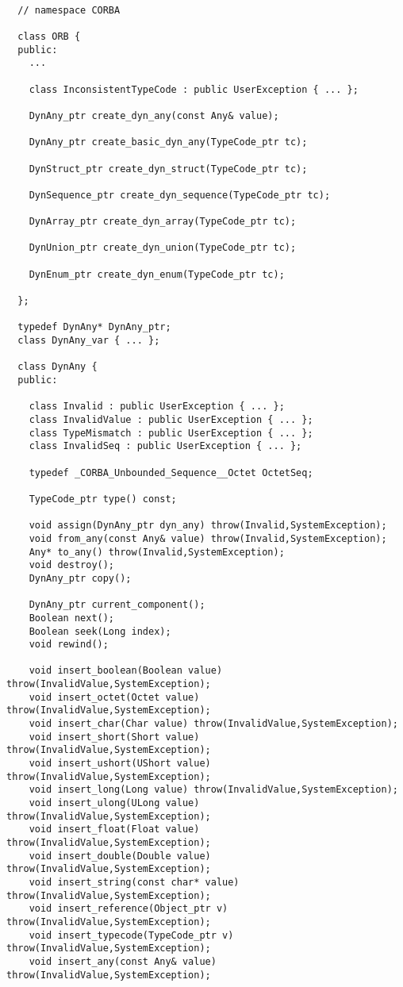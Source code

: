 \documentclass[11pt,twoside,onecolumn]{book}
\begin{document}
{\small
\begin{verbatim}

  // namespace CORBA

  class ORB {
  public:
    ...

    class InconsistentTypeCode : public UserException { ... };

    DynAny_ptr create_dyn_any(const Any& value);

    DynAny_ptr create_basic_dyn_any(TypeCode_ptr tc);

    DynStruct_ptr create_dyn_struct(TypeCode_ptr tc);

    DynSequence_ptr create_dyn_sequence(TypeCode_ptr tc);

    DynArray_ptr create_dyn_array(TypeCode_ptr tc);

    DynUnion_ptr create_dyn_union(TypeCode_ptr tc);

    DynEnum_ptr create_dyn_enum(TypeCode_ptr tc);

  };

  typedef DynAny* DynAny_ptr;
  class DynAny_var { ... };

  class DynAny {
  public:    

    class Invalid : public UserException { ... };
    class InvalidValue : public UserException { ... };
    class TypeMismatch : public UserException { ... };
    class InvalidSeq : public UserException { ... };

    typedef _CORBA_Unbounded_Sequence__Octet OctetSeq;

    TypeCode_ptr type() const;

    void assign(DynAny_ptr dyn_any) throw(Invalid,SystemException);
    void from_any(const Any& value) throw(Invalid,SystemException);
    Any* to_any() throw(Invalid,SystemException);
    void destroy();
    DynAny_ptr copy();

    DynAny_ptr current_component();
    Boolean next();
    Boolean seek(Long index);
    void rewind();

    void insert_boolean(Boolean value) throw(InvalidValue,SystemException);
    void insert_octet(Octet value) throw(InvalidValue,SystemException);
    void insert_char(Char value) throw(InvalidValue,SystemException);
    void insert_short(Short value) throw(InvalidValue,SystemException);
    void insert_ushort(UShort value) throw(InvalidValue,SystemException);
    void insert_long(Long value) throw(InvalidValue,SystemException);
    void insert_ulong(ULong value) throw(InvalidValue,SystemException);
    void insert_float(Float value) throw(InvalidValue,SystemException);
    void insert_double(Double value) throw(InvalidValue,SystemException);
    void insert_string(const char* value) throw(InvalidValue,SystemException);
    void insert_reference(Object_ptr v) throw(InvalidValue,SystemException);
    void insert_typecode(TypeCode_ptr v) throw(InvalidValue,SystemException);
    void insert_any(const Any& value) throw(InvalidValue,SystemException);


\end{verbatim}}
\end{document}

